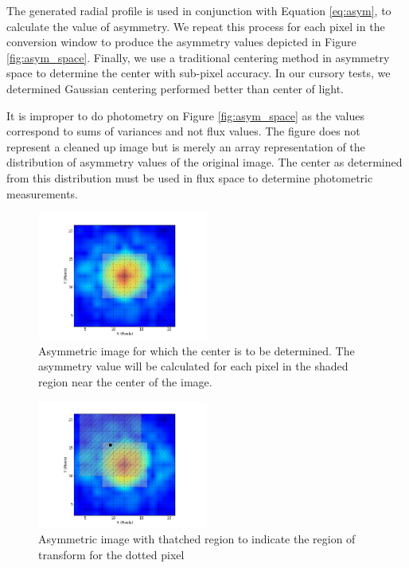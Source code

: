 \documentclass{article}
\begin{document}
The generated radial profile is used in conjunction with Equation
\ref{eq:asym}, to calculate the value of asymmetry.  We repeat this
process for each pixel in the conversion window to produce the
asymmetry values depicted in Figure \ref{fig:asym_space}. Finally, we
use a traditional centering method in asymmetry space to determine the
center with sub-pixel accuracy. In our cursory tests, we determined
Gaussian centering performed better than center of light.

It is improper to do photometry on Figure \ref{fig:asym_space} as the
values correspond to sums of variances and not flux values. The figure
does not represent a cleaned up image but is merely an array
representation of the distribution of asymmetry values of the original
image. The center as determined from this distribution must be used in
flux space to determine photometric measurements.

\begin{figure}
  \centering
  \includegraphics[width=0.5\textwidth]{f1.png}
  \caption{Asymmetric image for which the center is to be determined. The
    asymmetry value will be calculated for each pixel in the shaded
    region near the center of the image.}
  \label{fig:pre_transform}
\end{figure}

\begin{figure}
  \centering
  \includegraphics[width=0.5\textwidth]{f2.png}
  \caption{Asymmetric image with thatched region to indicate the region of
  transform for the dotted pixel}
  \label{fig:pre_transform_with_ap}
\end{figure}
\end{document}
